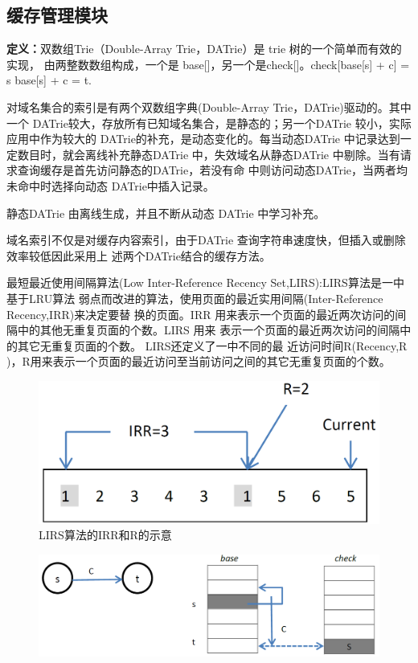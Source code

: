 

\subsection{缓存管理模块} 
\textbf{定义：}双数组Trie（Double-Array  Trie，DATrie）是 trie 树的一个简单而有效的实现，
由两整数数组构成，一个是 base[]，另一个是check[]。check[base[s] + c] = s base[s]
+ c = t.
\par{对域名集合的索引是有两个双数组字典(Double-Array  Trie，DATrie)驱动的。其中
	一个 DATrie较大，存放所有已知域名集合，是静态的；另一个DATrie 较小，实际应用中作为较大的
	DATrie的补充，是动态变化的。每当动态DATrie 中记录达到一定数目时，就会离线补充静态DATrie
	中，失效域名从静态DATrie 中剔除。当有请求查询缓存是首先访问静态的DATrie，若没有命
	中则访问动态DATrie，当两者均未命中时选择向动态 DATrie中插入记录。 
}
\par{ 静态DATrie 由离线生成，并且不断从动态 DATrie 中学习补充。 }
\par{ 域名索引不仅是对缓存内容索引，由于DATrie 查询字符串速度快，但插入或删除效率较低因此采用上
	述两个DATrie结合的缓存方法。 }
\par{ 最短最近使用间隔算法(Low  Inter-Reference  Recency  Set,LIRS):LIRS算法是一中基于LRU算法
	弱点而改进的算法，使用页面的最近实用间隔(Inter-Reference Recency,IRR)来决定要替
	换的页面。IRR 用来表示一个页面的最近两次访问的间隔中的其他无重复页面的个数。LIRS 用来
	表示一个页面的最近两次访问的间隔中的其它无重复页面的个数。 LIRS还定义了一中不同的最
	近访问时间R(Recency,R )，R用来表示一个页面的最近访问至当前访问之间的其它无重复页面的个数。 }
\begin{figure}[H]
\centering
\includegraphics[keepaspectratio, scale=0.4]{pitures/irr.png}
\caption{LIRS算法的IRR和R的示意} 
\end{figure}

\begin{figure}[H]
\centering
\includegraphics[keepaspectratio, scale=0.4]{pitures/aaa.png}
\caption{} 
\end{figure}

